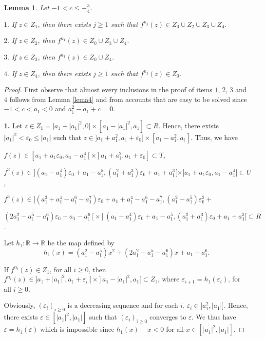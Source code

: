 \documentclass[11pt]{amsart}
\newtheorem{lemma}[theorem]{Lemma}
\theoremstyle{definition}
\begin{document}
\begin{lemma}
	Let $-1<c\leq -\frac{3}{4}$.
	
	\noindent $1.$ If $z\in Z_1$, then there exists $j\geq 1$ such that $f^{n_j}(z)\in Z_0\cup Z_2\cup Z_3\cup Z_4$. \label{lemaazia1}

 	\noindent $2.$ If $z\in Z_2$, then $f^{n_1}(z)\in Z_0\cup Z_3\cup Z_4$.

	\noindent $3.$ If $z\in Z_3$, then $f^{n_1}(z)\in Z_0\cup Z_4$.
	
	\noindent $4.$ If $z\in Z_4$, then there exists $j\geq 1$ such that $f^{n_j}(z)\in Z_0$.
\end{lemma}
\begin{proof} First observe that almost every inclusions in the proof of items $1$, $2$, $3$ and $4$ follows from Lemma \ref{lema4} and from accounts that are easy to be solved  since $-1<c<a_1<0$ and $a_1^2-a_1+c=0$.

\smallskip 

\textbf{1.}	Let $z\in Z_1=]a_1+|a_1|^2,0]\times[a_1-|a_1|^2,a_1]\subset R$. Hence, there exists $|a_1|^2< \varepsilon_0\leq |a_1|$ such that $z\in ]a_1+a_1^2,a_1+\varepsilon_0]\times[a_1-a_1^2,a_1]$. Thus, we have

\smallskip 

\noindent $f(z)\in [a_1+a_1\varepsilon_0,a_1-a_1^4[\times ]a_1+a_1^2,a_1+\varepsilon_0]\subset T$,

\noindent $f^2(z)\in  ](a_1-a_1^4)\varepsilon_0 +a_1-a_1^5 ,(a_1^2+a_1^3)\varepsilon_0 +a_1+a_1^3[\times [a_1+a_1\varepsilon_0,a_1-a_1^4[ \subset U$,

\noindent $f^3(z)\in ](a_1^3+a_1^4-a_1^6-a_1^7)\varepsilon_0+a_1+a_1^4-a_1^6-a_1^7, (a_1^2-a_1^5)\varepsilon_0^2 +$ 

\noindent $(2a_1^2-a_1^5-a_1^6)\varepsilon_0 +a_1-a_1^6[\times ](a_1-a_1^4)\varepsilon_0 +a_1-a_1^5 ,(a_1^2+a_1^3)\varepsilon_0 +a_1+a_1^3[\subset R$.

\smallskip 

Let $h_1:\mathbb{R}\longrightarrow\mathbb{R}$ be the map defined by $$h_1(x)=(a_1^2-a_1^5)x^2 +(2a_1^2-a_1^5-a_1^6)x +a_1-a_1^6.$$
	
	If $f^{n_i}(z)\in Z_1$, for all $i\geq 0$, then $f^{n_i}(z)\in ]a_1+|a_1|^2, a_1+\varepsilon_i[\times]a_1-|a_1|^2,a_1[\subset Z_1$, where $\varepsilon_{i+1}=h_1(\varepsilon_i)$, for all $i\geq 0$.
	
Obviously, $(\varepsilon_i)_{i\geq 0}$ is a decreasing sequence and for each $i$, $\varepsilon_i \in]a_1^2,|a_1|]$.
Hence, there exists $\varepsilon\in [|a_1|^2,|a_1|]$ such that $(\varepsilon_i)_{i\geq 0}$ converges to $\varepsilon$. We thus have $\varepsilon=h_1(\varepsilon)$ which is impossible since $h_1(x)-x<0$ for all $x\in [|a_1|^2,|a_1|]$.
	

\end{proof}
\end{document}
